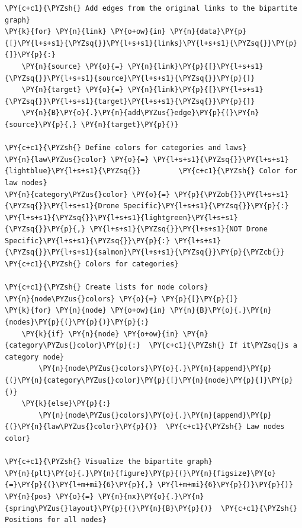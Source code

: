 \begin{tcolorbox}[breakable, size=fbox, boxrule=1pt, pad at break*=1mm,colback=cellbackground, colframe=cellborder]
\begin{Verbatim}[commandchars=\\\{\}]
\PY{c+c1}{\PYZsh{} Add edges from the original links to the bipartite graph}
\PY{k}{for} \PY{n}{link} \PY{o+ow}{in} \PY{n}{data}\PY{p}{[}\PY{l+s+s1}{\PYZsq{}}\PY{l+s+s1}{links}\PY{l+s+s1}{\PYZsq{}}\PY{p}{]}\PY{p}{:}
    \PY{n}{source} \PY{o}{=} \PY{n}{link}\PY{p}{[}\PY{l+s+s1}{\PYZsq{}}\PY{l+s+s1}{source}\PY{l+s+s1}{\PYZsq{}}\PY{p}{]}
    \PY{n}{target} \PY{o}{=} \PY{n}{link}\PY{p}{[}\PY{l+s+s1}{\PYZsq{}}\PY{l+s+s1}{target}\PY{l+s+s1}{\PYZsq{}}\PY{p}{]}
    \PY{n}{B}\PY{o}{.}\PY{n}{add\PYZus{}edge}\PY{p}{(}\PY{n}{source}\PY{p}{,} \PY{n}{target}\PY{p}{)}

\PY{c+c1}{\PYZsh{} Define colors for categories and laws}
\PY{n}{law\PYZus{}color} \PY{o}{=} \PY{l+s+s1}{\PYZsq{}}\PY{l+s+s1}{lightblue}\PY{l+s+s1}{\PYZsq{}}         \PY{c+c1}{\PYZsh{} Color for law nodes}
\PY{n}{category\PYZus{}color} \PY{o}{=} \PY{p}{\PYZob{}}\PY{l+s+s1}{\PYZsq{}}\PY{l+s+s1}{Drone Specific}\PY{l+s+s1}{\PYZsq{}}\PY{p}{:} \PY{l+s+s1}{\PYZsq{}}\PY{l+s+s1}{lightgreen}\PY{l+s+s1}{\PYZsq{}}\PY{p}{,} \PY{l+s+s1}{\PYZsq{}}\PY{l+s+s1}{NOT Drone Specific}\PY{l+s+s1}{\PYZsq{}}\PY{p}{:} \PY{l+s+s1}{\PYZsq{}}\PY{l+s+s1}{salmon}\PY{l+s+s1}{\PYZsq{}}\PY{p}{\PYZcb{}}  \PY{c+c1}{\PYZsh{} Colors for categories}

\PY{c+c1}{\PYZsh{} Create lists for node colors}
\PY{n}{node\PYZus{}colors} \PY{o}{=} \PY{p}{[}\PY{p}{]}
\PY{k}{for} \PY{n}{node} \PY{o+ow}{in} \PY{n}{B}\PY{o}{.}\PY{n}{nodes}\PY{p}{(}\PY{p}{)}\PY{p}{:}
    \PY{k}{if} \PY{n}{node} \PY{o+ow}{in} \PY{n}{category\PYZus{}color}\PY{p}{:}  \PY{c+c1}{\PYZsh{} If it\PYZsq{}s a category node}
        \PY{n}{node\PYZus{}colors}\PY{o}{.}\PY{n}{append}\PY{p}{(}\PY{n}{category\PYZus{}color}\PY{p}{[}\PY{n}{node}\PY{p}{]}\PY{p}{)}
    \PY{k}{else}\PY{p}{:}
        \PY{n}{node\PYZus{}colors}\PY{o}{.}\PY{n}{append}\PY{p}{(}\PY{n}{law\PYZus{}color}\PY{p}{)}  \PY{c+c1}{\PYZsh{} Law nodes color}

\PY{c+c1}{\PYZsh{} Visualize the bipartite graph}
\PY{n}{plt}\PY{o}{.}\PY{n}{figure}\PY{p}{(}\PY{n}{figsize}\PY{o}{=}\PY{p}{(}\PY{l+m+mi}{6}\PY{p}{,} \PY{l+m+mi}{6}\PY{p}{)}\PY{p}{)}
\PY{n}{pos} \PY{o}{=} \PY{n}{nx}\PY{o}{.}\PY{n}{spring\PYZus{}layout}\PY{p}{(}\PY{n}{B}\PY{p}{)}  \PY{c+c1}{\PYZsh{} Positions for all nodes}


\end{Verbatim}
\end{tcolorbox}

